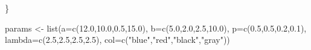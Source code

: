 \documentclass[
]{article}
\newenvironment{Shaded}{\begin{snugshade}}{\end{snugshade}}
\newcommand{\AttributeTok}[1]{\textcolor[rgb]{0.77,0.63,0.00}{#1}}
\newcommand{\FloatTok}[1]{\textcolor[rgb]{0.00,0.00,0.81}{#1}}
\newcommand{\FunctionTok}[1]{\textcolor[rgb]{0.00,0.00,0.00}{#1}}
\newcommand{\NormalTok}[1]{#1}
\newcommand{\OtherTok}[1]{\textcolor[rgb]{0.56,0.35,0.01}{#1}}
\newcommand{\StringTok}[1]{\textcolor[rgb]{0.31,0.60,0.02}{#1}}
\begin{document}
\begin{Shaded}
\begin{Highlighting}[]
\NormalTok{\}}



\NormalTok{params }\OtherTok{\textless{}{-}} \FunctionTok{list}\NormalTok{(}\AttributeTok{a=}\FunctionTok{c}\NormalTok{(}\FloatTok{12.0}\NormalTok{,}\FloatTok{10.0}\NormalTok{,}\FloatTok{0.5}\NormalTok{,}\FloatTok{15.0}\NormalTok{),}
               \AttributeTok{b=}\FunctionTok{c}\NormalTok{(}\FloatTok{5.0}\NormalTok{,}\FloatTok{2.0}\NormalTok{,}\FloatTok{2.5}\NormalTok{,}\FloatTok{10.0}\NormalTok{),}
               \AttributeTok{p=}\FunctionTok{c}\NormalTok{(}\FloatTok{0.5}\NormalTok{,}\FloatTok{0.5}\NormalTok{,}\FloatTok{0.2}\NormalTok{,}\FloatTok{0.1}\NormalTok{),}
               \AttributeTok{lambda=}\FunctionTok{c}\NormalTok{(}\FloatTok{2.5}\NormalTok{,}\FloatTok{2.5}\NormalTok{,}\FloatTok{2.5}\NormalTok{,}\FloatTok{2.5}\NormalTok{),}
               \AttributeTok{col=}\FunctionTok{c}\NormalTok{(}\StringTok{"blue"}\NormalTok{,}\StringTok{"red"}\NormalTok{,}\StringTok{"black"}\NormalTok{,}\StringTok{"gray"}\NormalTok{))}


\end{Highlighting}
\end{Shaded}
\end{document}
